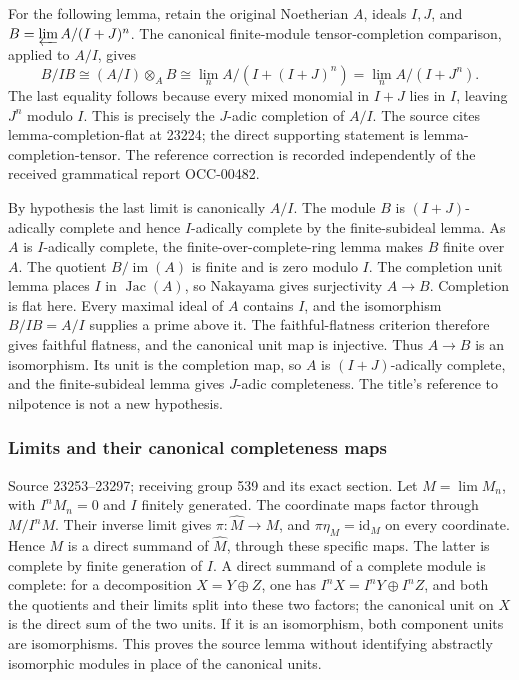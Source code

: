For the following lemma, retain the original Noetherian \(A\), ideals \(I,J\), and \(B=\varprojlim A/(I+J)^n\). The canonical finite-module tensor-completion comparison, applied to \(A/I\), gives \[
B/IB
 \cong (A/I)\otimes_A B
 \cong \lim_n A/(I+(I+J)^n)
 =\lim_n A/(I+J^n).
\] The last equality follows because every mixed monomial in \(I+J\) lies in \(I\), leaving \(J^n\) modulo \(I\). This is precisely the \(J\)-adic completion of \(A/I\). The source cites lemma-completion-flat at 23224; the direct supporting statement is lemma-completion-tensor. The reference correction is recorded independently of the received grammatical report OCC-00482.

By hypothesis the last limit is canonically \(A/I\). The module \(B\) is \((I+J)\)-adically complete and hence \(I\)-adically complete by the finite-subideal lemma. As \(A\) is \(I\)-adically complete, the finite-over-complete-ring lemma makes \(B\) finite over \(A\). The quotient \(B/\operatorname{im}(A)\) is finite and is zero modulo \(I\). The completion unit lemma places \(I\) in \(\operatorname{Jac}(A)\), so Nakayama gives surjectivity \(A\to B\). Completion is flat here. Every maximal ideal of \(A\) contains \(I\), and the isomorphism \(B/IB=A/I\) supplies a prime above it. The faithful-flatness criterion therefore gives faithful flatness, and the canonical unit map is injective. Thus \(A\to B\) is an isomorphism. Its unit is the completion map, so \(A\) is \((I+J)\)-adically complete, and the finite-subideal lemma gives \(J\)-adic completeness. The title's reference to nilpotence is not a new hypothesis.

\subsubsection{Limits and their canonical completeness maps}\label{algebra-proof-015-limits-and-their-canonical-completeness-maps}

Source 23253--23297; receiving group 539 and its exact section. Let \(M=\lim M_n\), with \(I^nM_n=0\) and \(I\) finitely generated. The coordinate maps factor through \(M/I^nM\). Their inverse limit gives \(\pi:\widehat M\to M\), and \(\pi\eta_M=\mathrm{id}_M\) on every coordinate. Hence \(M\) is a direct summand of \(\widehat M\), through these specific maps. The latter is complete by finite generation of \(I\). A direct summand of a complete module is complete: for a decomposition \(X=Y\oplus Z\), one has \(I^nX=I^nY\oplus I^nZ\), and both the quotients and their limits split into these two factors; the canonical unit on \(X\) is the direct sum of the two units. If it is an isomorphism, both component units are isomorphisms. This proves the source lemma without identifying abstractly isomorphic modules in place of the canonical units.

